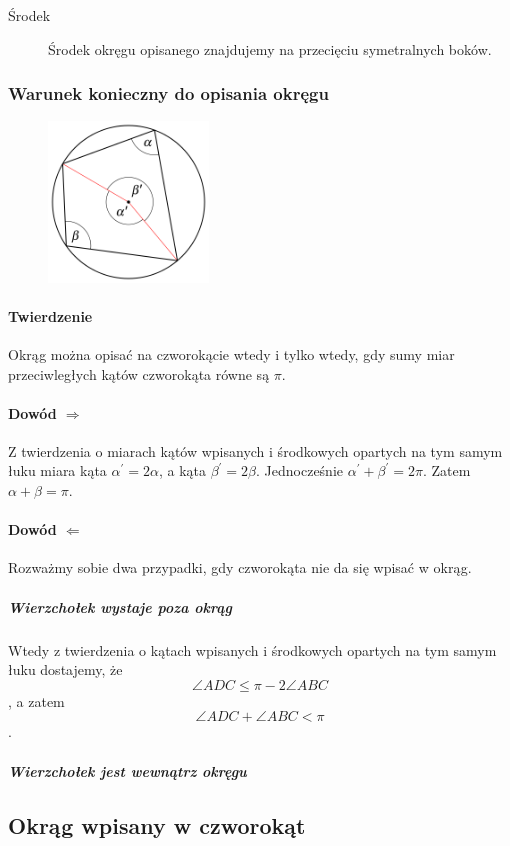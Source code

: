 \documentclass [a4paper, 12pt, oneside]{article}
\begin{document}
\begin{description}
\item[Środek] Środek okręgu opisanego znajdujemy na przecięciu symetralnych boków.
\end{description}

\subsubsection{Warunek konieczny do opisania okręgu}
\begin{figure}[h!]
      \centering\includegraphics[width=0.38\textwidth]{Graphics/geometria1}
	  \end{figure}
\paragraph{Twierdzenie}
Okrąg można opisać na czworokącie wtedy i tylko wtedy, gdy sumy miar przeciwległych kątów czworokąta równe są $\pi$.
\paragraph{Dowód $\Rightarrow$}
Z twierdzenia o miarach kątów wpisanych i środkowych opartych na tym samym łuku miara kąta $\alpha^\prime = 2\alpha$, a kąta $\beta^\prime = 2\beta$. Jednocześnie $\alpha^\prime + \beta^\prime = 2\pi$. Zatem $\alpha + \beta = \pi$.
\paragraph{Dowód $\Leftarrow$}
Rozważmy sobie dwa przypadki, gdy czworokąta nie da się wpisać w okrąg.
\subparagraph{Wierzchołek wystaje poza okrąg}
Wtedy z twierdzenia o kątach wpisanych i środkowych opartych na tym samym łuku dostajemy, że $$\angle ADC \le \pi - 2\angle ABC$$, a zatem $$\angle ADC + \angle ABC < \pi$$.
\subparagraph{Wierzchołek jest wewnątrz okręgu}

\subsection{Okrąg wpisany w czworokąt}
\end{document}
